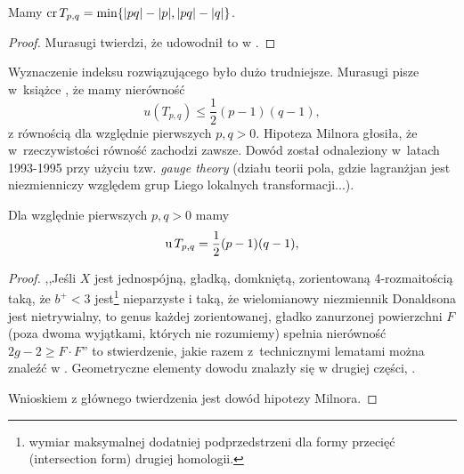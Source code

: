 \begin{proposition}
%
    Mamy $\operatorname{cr} T_{p, q} = \min \{|pq| - |p|, |pq| - |q|\}$.
\end{proposition}

\begin{proof}
%
    Murasugi twierdzi, że udowodnił to w \cite{murasugi91}.
\end{proof}

Wyznaczenie indeksu rozwiązującego było dużo trudniejsze.
Murasugi pisze w~książce \cite{murasugi96}, że mamy nierówność
\begin{equation}
    u(T_{p, q}) \le \frac 12 (p-1)(q-1),
\end{equation}
z równością dla względnie pierwszych $p, q > 0$.
Hipoteza Milnora głosiła, że w~rzeczywistości równość zachodzi zawsze.
Dowód został odnaleziony w~latach 1993-1995 przy użyciu tzw. \emph{gauge theory} (działu teorii pola, gdzie lagranżjan jest niezmienniczy względem grup Liego lokalnych transformacji...).

\begin{proposition}
%
\label{prp:torus_unknotting_number}%
    Dla względnie pierwszych $p, q > 0$ mamy
    \begin{equation}
        \operatorname{u} T_{p, q} = \frac 12 (p - 1)(q - 1),
    \end{equation}
\end{proposition}


\begin{proof}
%
    ,,Jeśli $X$ jest jednospójną, gładką, domkniętą, zorientowaną 4-rozmaitością taką, że $b^+ < 3$ jest\footnote{wymiar maksymalnej dodatniej podprzedstrzeni dla formy przecięć (intersection form) drugiej homologii.} nieparzyste i taką, że wielomianowy niezmiennik Donaldsona jest nietrywialny, to genus każdej zorientowanej, gładko zanurzonej powierzchni $F$ (poza dwoma wyjątkami, których nie rozumiemy) spełnia nierówność $2g - 2 \ge F \cdot F$'' to stwierdzenie, jakie razem z~technicznymi lematami można znaleźć w \cite{kronheimer93}.
    Geometryczne elementy dowodu znalazły się w drugiej części, \cite{kronheimer95}.

    Wnioskiem z głównego twierdzenia jest dowód hipotezy Milnora.
\end{proof}


